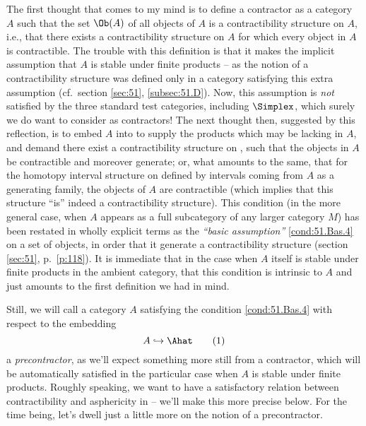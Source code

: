 The first thought that comes to my mind is to define a contractor as a
category $A$ such that the set $\Ob(A)$ of all objects of $A$ is a
contractibility structure on $A$, i.e., that there exists a
contractibility structure on $A$ for which every object in $A$ is
contractible. The trouble with this definition is that it makes the
implicit assumption that $A$ is stable under finite products -- as the
notion of a contractibility structure was defined only in a category
satisfying this extra assumption (cf.\ section \ref{sec:51},
\ref{subsec:51.D}). Now, this assumption is \emph{not} satisfied by
the three standard test categories, including $\Simplex$, which surely
we do want to consider as contractors! The next thought then,
suggested by this reflection, is to embed $A$ into \Ahat{} to supply
the products which may be lacking in $A$, and demand there exist a
contractibility structure on \Ahat, such that the objects in $A$ be
contractible and moreover generate; or, what amounts to the same, that
for the homotopy interval structure on \Ahat{} defined by intervals
coming from $A$ as a generating family, the objects of $A$ are
contractible (which implies that this structure ``is'' indeed a
contractibility structure). This condition (in the more general case,
when $A$ appears as a full subcategory of any larger category $M$) has
been restated in wholly explicit terms as the \emph{``basic
  assumption''} \ref{cond:51.Bas.4} on a set of objects, in order that
it generate a contractibility structure (section \ref{sec:51}, p.\
\ref{p:118}). It is immediate that in the case when $A$ itself is
stable under finite products in the ambient category, that this
condition is intrinsic to $A$ and just amounts to the first definition
we had in mind.

Still, we will call a category $A$ satisfying the
condition \ref{cond:51.Bas.4} with respect to the embedding
\begin{equation}
  \label{eq:95.1}
  A\hookrightarrow\Ahat
  \tag{1}
\end{equation}
a \emph{precontractor}, as we'll expect something more still from a
contractor, which will be automatically satisfied in the particular
case when $A$ is stable under finite products. Roughly speaking, we
want to have a satisfactory relation between contractibility and
asphericity in \Ahat{} -- we'll make this more precise below. For the
time being, let's dwell just a little more on the notion of a
precontractor.

